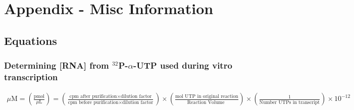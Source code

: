 
\chapter{Appendix - Misc Information} %

\label{AppendixA} %


\section{Equations}\label{sec:Equations}

\subsection{Determining [RNA] from $^{32}$P-$\alpha$-UTP used during vitro transcription}

{\tiny{
\begin{eqnarray*}
\mu \mbox{M} = \left( \frac{\mbox{pmol}}{\mu\mbox{L}}\right)
      = \left( \frac{\mbox{cpm after purification} \times \mbox{dilution factor}}{\mbox{cpm before purification} \times \mbox{dilution factor}} \right)
      \times \left( \frac{\mbox{mol UTP in original reaction}}{\mbox{Reaction Volume }} \right) \times \left( \frac{1}{\mbox{Number UTPs in transcript}} \right) \times 10^{-12} 
\end{eqnarray*}
}
}


